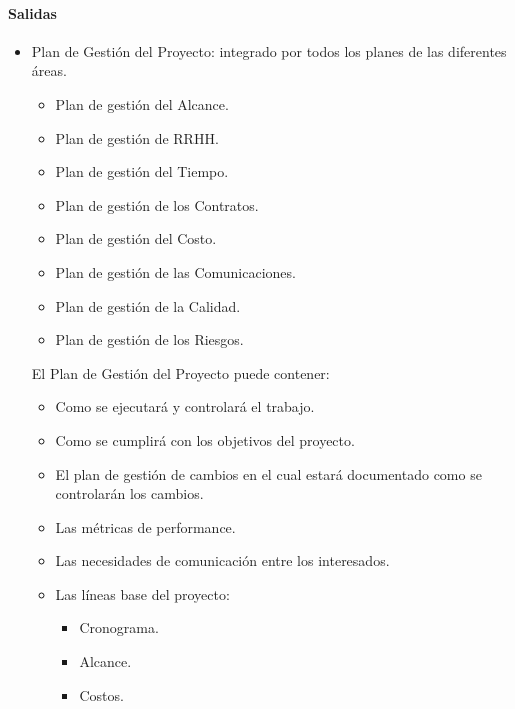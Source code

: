 \documentclass[a4paper,twosides]{article}
\newlength{\wideitemsep}
\let\olditem\item
\renewcommand{\item}{\setlength{\itemsep}{\wideitemsep}\olditem}
\begin{document}
\paragraph{Salidas}
\begin{itemize}
\item Plan de Gestión del Proyecto: integrado por todos los planes de las diferentes áreas.
\begin{itemize}
\item Plan de gestión del Alcance.
\item Plan de gestión de RRHH.
\item Plan de gestión del Tiempo.
\item Plan de gestión de los Contratos.
\item Plan de gestión del Costo.
\item Plan de gestión de las Comunicaciones.
\item Plan de gestión de la Calidad.
\item Plan de gestión de los Riesgos.
\end{itemize}
El Plan de Gestión del Proyecto puede contener:
\begin{itemize}
\item Como se ejecutará y controlará el trabajo.
\item Como se cumplirá con los objetivos del proyecto.
\item El plan de gestión de cambios en el cual estará documentado como se controlarán los cambios.
\item Las métricas de performance.
\item Las necesidades de comunicación entre los interesados.
\item Las líneas base del proyecto:
\begin{itemize}
\item Cronograma.
\item Alcance.
\item Costos.
\end{itemize}
\end{itemize}
\end{itemize}
\end{document}

